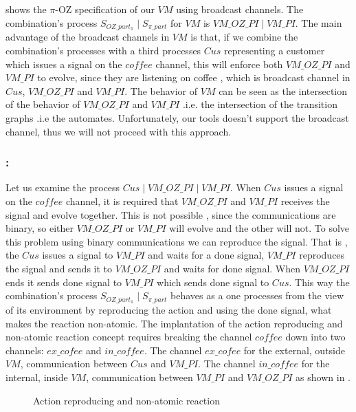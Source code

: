  shows the $\pi$-OZ specification of our $VM$ using broadcast channels.
The combination's process $S_{OZ\_part_\pi} \mid S_{\pi\_part}$ for $VM$ is $VM\_OZ\_PI \mid VM\_PI$. The main advantage of the broadcast channels in $VM$ is that, if we combine the combination's processes with a third processes $Cus$ representing a customer which issues a signal on the $coffee$ channel, this will enforce both $VM\_OZ\_PI$ and $VM\_PI$ to evolve, since they are listening on coffee , which is broadcast channel in  $Cus$, $VM\_OZ\_PI$ and $VM\_PI$. The behavior of $VM$ can be seen as the intersection of the behavior of  $VM\_OZ\_PI$ and $VM\_PI$ .i.e. the intersection of the transition graphs .i.e the automates. Unfortunately, our tools doesn't support the broadcast channel, thus we will not proceed with this approach.




\subsubsection{:} Let us examine the process $Cus \mid VM\_OZ\_PI \mid VM\_PI$. When $Cus$ issues a signal on the $coffee$ channel, it is required that $VM\_OZ\_PI$ and $VM\_PI$ receives the signal and evolve together. This is not possible , since the \picalc{} communications are binary, so either $VM\_OZ\_PI$ or $VM\_PI$ will evolve and the other will not. To solve this problem using binary communications we can reproduce the signal. That is , the $Cus$ issues a signal to $VM\_PI$ and waits for a done signal, $VM\_PI$ reproduces the signal and sends it to $VM\_OZ\_PI$ and waits for done signal. When $VM\_OZ\_PI$ ends it sends done signal to $VM\_PI$ which sends done signal to $Cus$. This way the combination's process $S_{OZ\_part_\pi} \mid S_{\pi\_part}$ behaves as a one processes from the view of its environment by reproducing the action and using the done signal, what makes the reaction non-atomic. The implantation of the action reproducing and non-atomic reaction concept requires breaking the channel $coffee$ down into two channels: $ex\_cofee$ and $in\_coffee$. The channel $ex\_cofee$ for the external, outside $VM$, communication between $Cus$ and $VM\_PI$. The channel $in\_coffee$ for the internal, inside $VM$, communication between $VM\_PI$ and $VM\_OZ\_PI$ as shown in .

\begin{figure}[H]%
\centering
{}%
\caption{Action reproducing and non-atomic reaction}
\label{non_atomic_reactoin}%
\end{figure}


